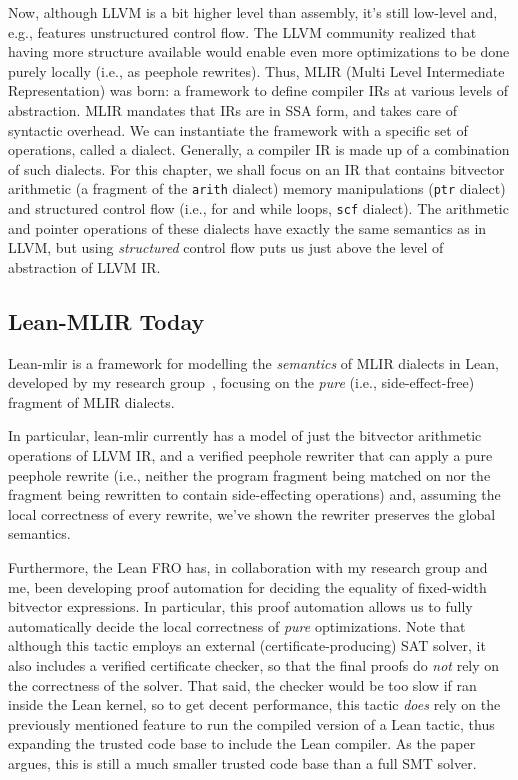 \documentclass[a4paper]{scrartcl}
\begin{document}
Now, although LLVM is a bit higher level than assembly, it's still
low-level and, e.g., features unstructured control flow. The LLVM
community realized that having more structure available would enable
even more optimizations to be done purely locally (i.e., as peephole
rewrites). Thus, MLIR (Multi Level Intermediate Representation) was
born: a framework to define compiler IRs at various levels of
abstraction. MLIR mandates that IRs are in SSA form, and takes care of
syntactic overhead. We can instantiate the framework with a specific set
of operations, called a dialect. Generally, a compiler IR is made up of
a combination of such dialects. For this chapter, we shall focus on an
IR that contains bitvector arithmetic (a fragment of the \texttt{arith}
dialect) memory manipulations (\texttt{ptr} dialect) and structured
control flow (i.e., for and while loops, \texttt{scf} dialect). 
The arithmetic and pointer operations of these dialects have exactly the same semantics as in LLVM, 
but using \emph{structured} control flow puts us just above the level of abstraction of LLVM IR.

\subsection{Lean-MLIR Today}\label{lean-mlir-today}

Lean-mlir is a framework for modelling the \emph{semantics} of MLIR
dialects in Lean, developed by my research group~\cite{bhatVerifyingPeepholeRewriting2024}, focusing on the
\emph{pure} (i.e., side-effect-free) fragment of MLIR dialects.

In particular, lean-mlir currently has a model of just the bitvector
arithmetic operations of LLVM IR, and a verified peephole rewriter that
can apply a pure peephole rewrite (i.e., neither the program fragment
being matched on nor the fragment being rewritten to contain
side-effecting operations) and, assuming the local correctness of every
rewrite, we've shown the rewriter preserves the global semantics.

Furthermore, the Lean FRO has, in collaboration with my research group
and me, been developing proof automation for deciding the equality
of fixed-width bitvector expressions\cite{bovingTamingBitvectorBestiary}. In
particular, this proof automation allows us to fully automatically
decide the local correctness of \emph{pure} optimizations. Note that
although this tactic employs an external (certificate-producing) SAT
solver, it also includes a verified certificate checker, so that the
final proofs do \emph{not} rely on the correctness of the solver. That
said, the checker would be too slow if ran inside the Lean kernel, so to
get decent performance, this tactic \emph{does} rely on the previously
mentioned feature to run the compiled version of a Lean tactic, thus expanding
the trusted code base to include the Lean compiler.
As the paper argues, this is still a much smaller trusted code base than a full
SMT solver.
\end{document}
